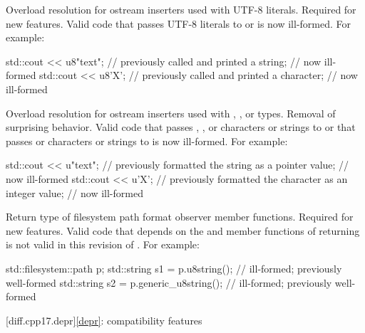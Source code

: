 %
\change
Overload resolution for ostream inserters used with UTF-8 literals.
\rationale
Required for new features.
\effect
Valid \CppXVII{} code that passes UTF-8 literals to
 or
 is now ill-formed.
For example:
\begin{codeblock}
std::cout << u8"text";          // previously called  and printed a string;
                                // now ill-formed
std::cout << u8'X';             // previously called  and printed a character;
                                // now ill-formed
\end{codeblock}

\change
Overload resolution for ostream inserters
used with , , or  types.
\rationale
Removal of surprising behavior.
\effect
Valid \CppXVII{} code that passes
, , or  characters or strings
to  or
that passes  or  characters or strings
to  is now ill-formed.
For example:
\begin{codeblock}
std::cout << u"text";           // previously formatted the string as a pointer value;
                                // now ill-formed
std::cout << u'X';              // previously formatted the character as an integer value;
                                // now ill-formed
\end{codeblock}

\change
Return type of filesystem path format observer member functions.
\rationale
Required for new features.
\effect
Valid \CppXVII{} code that depends on the  and
 member functions of 
returning  is not valid in this revision of \Cpp{}.
For example:
\begin{codeblock}
std::filesystem::path p;
std::string s1 = p.u8string();          // ill-formed; previously well-formed
std::string s2 = p.generic_u8string();  // ill-formed; previously well-formed
\end{codeblock}

[diff.cpp17.depr]{\ref{depr}: compatibility features}

